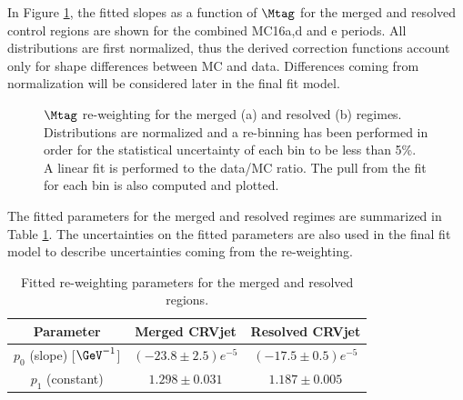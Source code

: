 In Figure \ref{fig:2lep_mtag_after_rw}, the fitted slopes as a function of $\Mtag$ for the merged and resolved control regions are shown for the combined MC16a,d and e periods. All distributions are first normalized, thus the derived correction functions account only for shape differences between \Zjets MC and data. Differences coming from normalization will be considered later in the final fit model. 


\begin{figure}[ht]
    \centering
    \caption{ $\Mtag$ re-weighting for the merged (a) and resolved (b) regimes. Distributions are normalized and a re-binning has been performed in order for the statistical uncertainty of each bin to be less than 5\%. A linear fit is performed to the data/MC ratio. The pull from the fit for each bin is also computed and plotted.} 
    \label{fig:2lep_mtag_after_rw}
\end{figure}

The fitted parameters for the merged and resolved regimes are summarized in Table \ref{tab:fit_res}. The uncertainties on the fitted parameters are also used in the final fit model to describe uncertainties coming from the \Mtag re-weighting.

\begin{table}[htbp]
 \footnotesize
\begin{center}
\begin{tabular}{ | c | c | c |}
\hline
Parameter & Merged CRVjet & Resolved CRVjet  \\ 
\hline
$p_{0}$ (slope) [$\GeV^{-1}$] & $(-23.8 \pm 2.5)e^{-5}$ &  $(-17.5 \pm 0.5)e^{-5}$ \\
 \hline
$p_{1}$ (constant)  & $1.298 \pm 0.031$ & $1.187 \pm 0.005$ \\ 
\hline
\end{tabular}
\caption{\label{tab:fit_res} Fitted re-weighting parameters for the merged and resolved regions. }
  \end{center}
\end{table}



